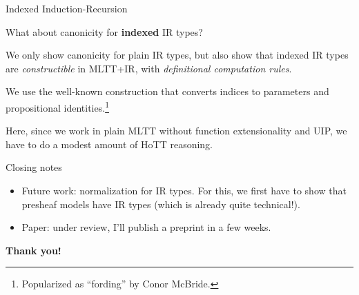 \documentclass[dvipsnames,aspectratio=169]{beamer}
\begin{document}
\begin{frame}{Indexed Induction-Recursion}

What about canonicity for \textbf{indexed} IR types?
\vspace{1em}

We only show canonicity for plain IR types, but also show that indexed IR types are
\emph{constructible} in MLTT+IR, with \emph{definitional computation rules}.

\vspace{1em}
We use the well-known construction that converts indices to parameters and propositional identities.\footnote{Popularized as ``fording'' by Conor McBride.}

\vspace{1em}
Here, since we work in plain MLTT without function extensionality and UIP, we have to do a modest amount of HoTT reasoning.

\end{frame}

\begin{frame}{Closing notes}

\vspace{-1em}
\begin{itemize}
\item Future work: normalization for IR types. For this, we first have to show that presheaf models have IR types (which is already quite technical!).
\item Paper: under review, I'll publish a preprint in a few weeks.
\end{itemize}
\vspace{3em}
\pause

\begin{center}
  \Large{\textbf{Thank you!}}
\end{center}


\end{frame}



\end{document}
